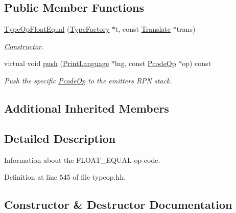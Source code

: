 \subsection*{Public Member Functions}
\begin{DoxyCompactItemize}
\item 
\mbox{\hyperlink{class_type_op_float_equal_ac308e75ffef467c24c234431f0c6c0ec}{Type\+Op\+Float\+Equal}} (\mbox{\hyperlink{class_type_factory}{Type\+Factory}} $\ast$t, const \mbox{\hyperlink{class_translate}{Translate}} $\ast$trans)
\begin{DoxyCompactList}\small\item\em \mbox{\hyperlink{class_constructor}{Constructor}}. \end{DoxyCompactList}\item 
virtual void \mbox{\hyperlink{class_type_op_float_equal_a4252abd880968a0e035d0520cb1ae172}{push}} (\mbox{\hyperlink{class_print_language}{Print\+Language}} $\ast$lng, const \mbox{\hyperlink{class_pcode_op}{Pcode\+Op}} $\ast$op) const
\begin{DoxyCompactList}\small\item\em Push the specific \mbox{\hyperlink{class_pcode_op}{Pcode\+Op}} to the emitter\textquotesingle{}s R\+PN stack. \end{DoxyCompactList}\end{DoxyCompactItemize}
\subsection*{Additional Inherited Members}


\subsection{Detailed Description}
Information about the F\+L\+O\+A\+T\+\_\+\+E\+Q\+U\+AL op-\/code. 

Definition at line 545 of file typeop.\+hh.



\subsection{Constructor \& Destructor Documentation}
\mbox{\label{class_type_op_float_equal_ac308e75ffef467c24c234431f0c6c0ec}} 
